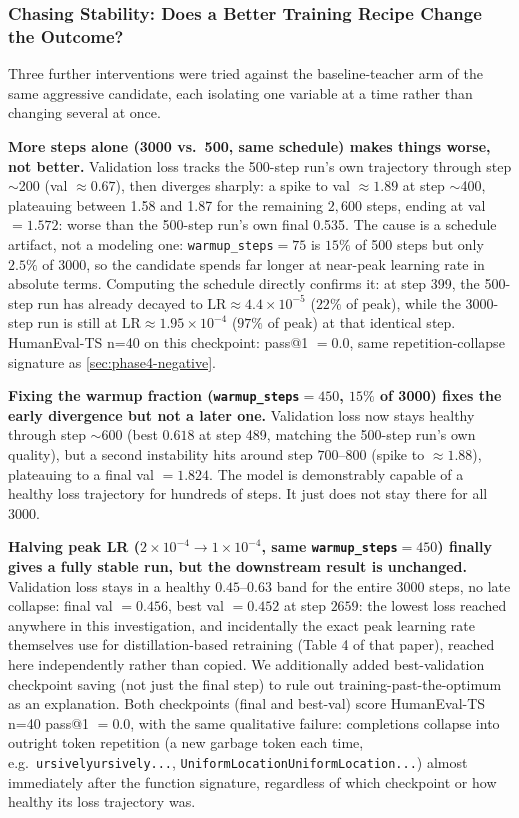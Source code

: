 \documentclass{article}
\theoremstyle{plain}
\theoremstyle{definition}
\theoremstyle{remark}
\begin{document}
\subsubsection{Chasing Stability: Does a Better Training Recipe Change the Outcome?}
\label{sec:phase4-lr-chase}

Three further interventions were tried against the baseline-teacher arm
of the same aggressive candidate, each isolating one variable at a time
rather than changing several at once.

\textbf{More steps alone (3000 vs.\ 500, same schedule) makes things
worse, not better.} Validation loss tracks the 500-step run's own
trajectory through step $\sim$200 (val $\approx 0.67$), then diverges
sharply: a spike to val $\approx 1.89$ at step $\sim$400, plateauing
between 1.58 and 1.87 for the remaining $2{,}600$ steps, ending at
val $=1.572$: worse than the 500-step run's own final 0.535. The cause
is a schedule artifact, not a modeling one: \texttt{warmup\_steps}$=75$
is $15\%$ of 500 steps but only $2.5\%$ of 3000, so the candidate spends
far longer at near-peak learning rate in absolute terms. Computing the
schedule directly confirms it: at step 399, the 500-step run has
already decayed to $\mathrm{LR}\approx4.4\times10^{-5}$ ($22\%$ of
peak), while the 3000-step run is still at
$\mathrm{LR}\approx1.95\times10^{-4}$ ($97\%$ of peak) at that identical
step. HumanEval-TS n=40 on this checkpoint: pass@1 $=0.0$, same
repetition-collapse signature as \cref{sec:phase4-negative}.

\textbf{Fixing the warmup fraction (\texttt{warmup\_steps}$=450$, $15\%$
of 3000) fixes the early divergence but not a later one.} Validation
loss now stays healthy through step $\sim$600 (best $0.618$ at step
489, matching the 500-step run's own quality), but a second instability
hits around step $700$--$800$ (spike to $\approx 1.88$), plateauing to a
final val $=1.824$. The model is demonstrably capable of a healthy loss
trajectory for hundreds of steps. It just does not stay there for all
3000.

\textbf{Halving peak LR ($2\times10^{-4}\to1\times10^{-4}$, same
\texttt{warmup\_steps}$=450$) finally gives a fully stable run, but
the downstream result is unchanged.} Validation loss stays in a healthy
$0.45$--$0.63$ band for the entire 3000 steps, no late collapse: final
val $=0.456$, best val $=0.452$ at step $2659$: the lowest loss
reached anywhere in this investigation, and incidentally the exact peak
learning rate \citet{minitron2024practice} themselves use for
distillation-based retraining (Table 4 of that paper), reached here
independently rather than copied. We additionally added best-validation
checkpoint saving (not just the final step) to rule out
training-past-the-optimum as an explanation. Both checkpoints (final
and best-val) score HumanEval-TS n=40 pass@1 $=0.0$, with the same
qualitative failure: completions collapse into outright token repetition
(a new garbage token each time, e.g.\ \texttt{ursivelyursively...},
\texttt{UniformLocationUniformLocation...}) almost immediately after the
function signature, regardless of which checkpoint or how healthy its
loss trajectory was.
\end{document}
